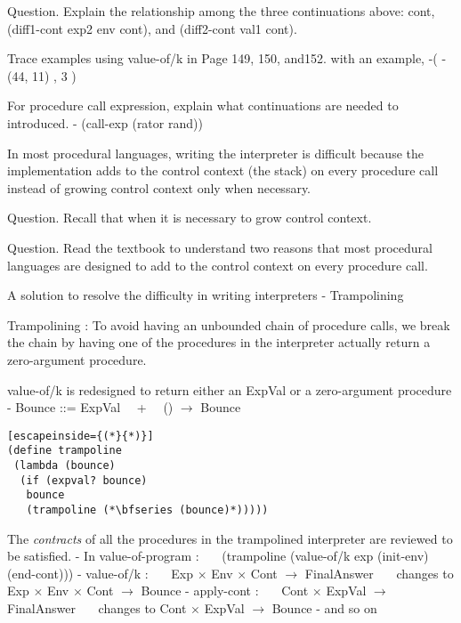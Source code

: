 \documentclass{article}
\begin{document}
\begin{huge}
Question. Explain the relationship among the three continuations above: cont, (diff1-cont exp2 env cont), and (diff2-cont val1 cont). 


Trace examples using value-of/k in Page 149, 150, and152. \al
with an example, -( -(44, 11) , 3 )

For procedure call expression, explain what continuations are needed to introduced. \al
- (call-exp (rator rand))


In most procedural languages, writing the interpreter is difficult because the implementation adds to the control context (the stack) 
on every procedure call instead of growing control context only when necessary.

Question. Recall that when it is necessary to grow control context.

Question. Read the textbook to understand two reasons that most procedural languages are designed to add to the control context
on every procedure call.

A solution to resolve the difficulty in writing interpreters \al
- Trampolining


Trampolining : To avoid having an unbounded chain of procedure calls, we break the chain by having
one of the procedures in the interpreter actually return a zero-argument procedure.

value-of/k is redesigned to return either an ExpVal or a zero-argument procedure \al
- Bounce ::= ExpVal \ \ + \ \ () $\rightarrow$ Bounce

\begin{lstlisting}[escapeinside={(*}{*)}]
(define trampoline
 (lambda (bounce)
  (if (expval? bounce) 
   bounce 
   (trampoline (*\bfseries (bounce)*))))) 
\end{lstlisting}


The {\it contracts} of all the procedures in the trampolined interpreter are reviewed to be satisfied. \al
- In value-of-program : \al
\ \ \ (trampoline (value-of/k exp (init-env) (end-cont))) \al
- value-of/k : \al 
\ \ \ Exp $\times$ Env $\times$ Cont $\rightarrow$ FinalAnswer \al
\ \ \ changes to Exp $\times$ Env $\times$ Cont $\rightarrow$ Bounce \al
- apply-cont : \al
\ \ \ Cont $\times$ ExpVal $\rightarrow$ FinalAnswer \al
\ \ \ changes to Cont $\times$ ExpVal $\rightarrow$ Bounce \al
- and so on


\end{huge}
\end{document}
